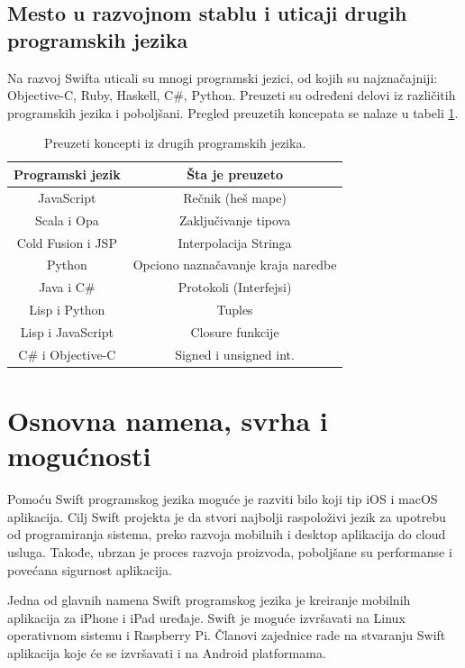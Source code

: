 \documentclass[a4paper]{article}
\begin{document}
\subsection{Mesto u razvojnom stablu i uticaji drugih programskih jezika}
\label{subsec:podnaslov6}
Na razvoj Swifta uticali su mnogi programski jezici, od kojih su najznačajniji: Objective-C, Ruby, Haskell, C\#, Python. Preuzeti su određeni delovi iz različitih programskih jezika i poboljšani. Pregled preuzetih koncepata se nalaze u tabeli \ref{tab:tabela2}.

\begin{table}[h!]
\begin{center}
\caption{Preuzeti koncepti iz drugih programskih jezika.}
\begin{tabular}{|c|c|} \hline
\label{tab:tabela2}
Programski jezik & Šta je preuzeto \\ \hline
JavaScript & Rečnik (heš mape) \\ \hline
Scala i Opa & Zaključivanje tipova \\ \hline
Cold Fusion i JSP & Interpolacija Stringa \\ \hline
Python & Opciono naznačavanje kraja naredbe \\ \hline
Java i C\# & Protokoli (Interfejsi) \\ \hline
Lisp i Python & Tuples \\ \hline
Lisp i JavaScript &  Closure funkcije \\ \hline
C\# i Objective-C & Signed i unsigned int. \\ \hline
\end{tabular}
\end{center}
\end{table}
\section{Osnovna namena, svrha i mogućnosti}	
\label{sec:drugiDeo}


Pomoću Swift programskog jezika moguće je razviti bilo koji tip iOS i macOS aplikacija. Cilj Swift projekta je da stvori najbolji raspoloživi jezik za upotrebu od programiranja sistema, preko razvoja mobilnih i desktop aplikacija do cloud usluga. Takođe, ubrzan je proces razvoja proizvoda, poboljšane su performanse i povećana sigurnost aplikacija.

Jedna od glavnih namena Swift programskog jezika je kreiranje mobilnih aplikacija za iPhone i iPad uređaje. Swift je moguće izvršavati na Linux operativnom sistemu i Raspberry Pi. Članovi zajednice rade na stvaranju Swift aplikacija koje će se izvršavati i na Android platformama.
\end{document}
